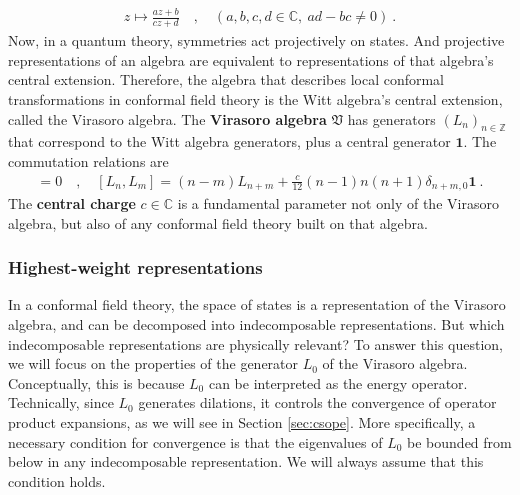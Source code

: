 \documentclass[12pt, a4paper]{article}
\theoremstyle{break}
\begin{document}
\begin{align}
 z \mapsto \frac{az+b}{cz+d}\quad , \quad (a,b,c,d\in \mathbb{C},\ ad-bc\neq 0)\ .
 \label{abcd}
\end{align}
Now, in a quantum theory, symmetries act projectively on states. And projective representations of an algebra are equivalent to representations of that algebra's central extension. Therefore, the algebra that describes local conformal transformations in conformal field theory is the Witt algebra's central extension, called the Virasoro algebra. The \textbf{Virasoro algebra} $\mathfrak{V}$ has generators $(L_n)_{n\in\mathbb{Z}}$ that correspond to the Witt algebra generators, plus a central generator $\mathbf 1$. The commutation relations are 
 \begin{align}
  [\mathbf 1, L_n] = 0 \quad , \quad \boxed{[L_n,L_m] = (n-m)L_{n+m} +\frac{c}{12}(n-1)n(n+1)\delta_{n+m,0}\mathbf 1} \ .
  \label{vir}
 \end{align}
 The \textbf{central charge} $c\in\mathbb{C}$ is a fundamental parameter not only of the Virasoro algebra, but also of any conformal field theory built on that algebra. 

\subsubsection{Highest-weight representations}\label{sec:hwr}

In a conformal field theory, the space of states is a representation of the Virasoro algebra, and can be decomposed into indecomposable representations. But which indecomposable representations are physically relevant? To answer this question, we will focus on the properties of the generator $L_0$ of the Virasoro algebra. Conceptually, this is because $L_0$ can be interpreted as the energy operator. Technically, since $L_0$ generates dilations, it controls the convergence of operator product expansions, as we will see in Section \ref{sec:csope}. More specifically, a necessary condition for convergence is that the eigenvalues of $L_0$ be bounded from below in any indecomposable representation. We will always assume that this condition holds.
\end{document}
